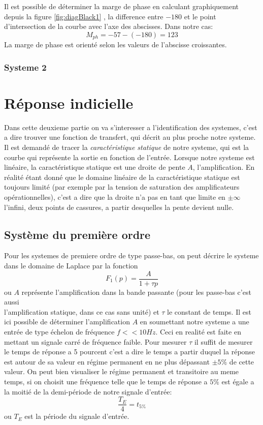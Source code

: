 \documentclass[12pt, a4paper]{report}
\begin{document}
Il est possible de déterminer la marge de phase en calculant graphiquement depuis la figure \ref{fig:diagBlack1}
, la difference entre 
$-180$ et le point d'intersection de la courbe avec l'axe des abscisses. Dans notre cas:
\[
    M_{ph} = -57 - (-180) = 123 
    \]
La marge de phase est orienté selon les valeurs de l'abscisse croissantes.\par

\subsubsection{Systeme 2}

\section{Réponse indicielle}

\par
Dans cette deuxieme partie on va s'interesser a l'identification des systemes, c'est a dire 
trouver une fonction de transfert, qui décrit au plus proche notre systeme. Il est demandé de tracer
la \textit{caractéristique statique} de notre systeme, qui est la courbe qui représente la sortie
en fonction de l'entrée. Lorsque notre systeme est linéaire, la caractéristique statique est
une droite de pente $A$, l'amplification. En réalité étant donné que le domaine linéaire de la caractéristique statique est
toujours limité (par exemple par la tension de saturation des amplificateurs opérationnelles), c'est a dire 
que la droite n'a pas en tant que limite en $\pm \infty$ l'infini, deux points de cassures, a partir desquelles
la pente devient nulle.

\subsection{Système du première ordre}

Pour les systemes de premiere ordre de type passe-bas, on peut décrire le systeme dans le domaine de Laplace
par la fonction 
\[
    F_{1}(p) = \frac{A}{1 + \tau p}     
\]
ou $A$ représente l'amplification dans la bande passante (pour les passe-bas c'est aussi\\ l'amplification statique, dans ce cas sans unité)
et $\tau$ le constant de temps. Il est ici possible de déterminer l'amplification $A$ en soumettant notre systeme
a une entrée de type échelon de fréquence $f << 10Hz$. Ceci en realité est faite en mettant un signale carré de fréquence faible. Pour mesurer $\tau$ il suffit de mesurer le temps de réponse a 5 pourcent
c'est a dire le temps a partir duquel la réponse est autour de sa valeur en régime permanent en ne plus dépassant $\pm 5\%$ de cette valeur. On peut bien visualiser
le régime permanent et transitoire au meme temps, si on choisit une fréquence telle que le temps de réponse a $5\%$ est égale a la moitié de la demi-période de notre
signale d'entrée:
\[
    \frac{T_{E}}{4} = t_{5\%}
\]
ou $T_{E}$ est la période du signale d'entrée.
\par
\end{document}
